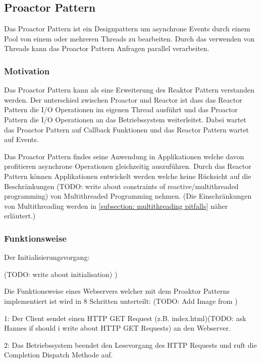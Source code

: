 \subsection{Proactor Pattern}
\label{section: Proactor Pattern}

Das Proactor Pattern ist ein Designpattern um asynchrone Events durch einem Pool von einem oder mehreren Threads zu bearbeiten. Durch das verwenden von Threads kann das Proactor Pattern Anfragen parallel verarbeiten. 

\subsubsection{Motivation}
Das Proactor Pattern kann als eine Erweiterung des Reaktor Pattern verstanden werden. Der unterschied zwischen Proactor und Reactor ist dass das Reactor Pattern die I/O Operationen im eigenen Thread ausführt und das Proactor Pattern die I/O Operationen an das Betriebssystem weiterleitet. Dabei wartet das Proactor Pattern auf Callback Funktionen und das Reactor Pattern wartet auf Events. \cite[p. 7]{CZY2009}

Das Proactor Pattern findes seine Anwendung in Applikationen welche davon profitieren asynchrone Operationen gleichzeitig auszuführen. Durch das Reactor Pattern können Applikationen entwickelt werden welche keine Rücksicht auf die Beschränkungen (TODO: write about constraints of reactive/multithreaded programming) von Multithreaded Programming nehmen. (Die Einschränkungen von Multithreading werden in \ref{subsection: multithreading pitfalls} näher erläutert.) \cite[p. 1]{Sch97}

\subsubsection{Funktionsweise}

Der Initialisierungsvorgang:

(TODO: write about initialisation)
\cite[p. 3]{Sch97})


Die Funktionsweise eines Webservers welcher mit dem Proaktor Patterns implementiert ist wird in 8 Schritten unterteilt: 
(TODO: Add Image from \cite[p. 4]{Sch97})

1: Der Client sendet einen HTTP GET Request (z.B. index.html)(TODO: ask Hannes if should i write about HTTP GET Requests) an den Webserver.  

2: Das Betriebssystem beendet den Lesevorgang des HTTP Requests und ruft die Completion Dispatch Methode auf. 

